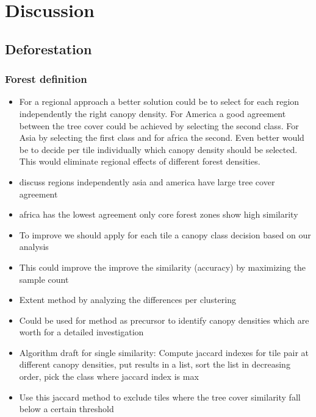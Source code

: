 \chapter{Discussion}
\label{ch:discussion}
	\section{Deforestation}
	\label{sec:discussion_deforestation}

		\subsection{Forest definition}
		\label{subsec:discussion_forest_definition}
			\begin{itemize}
				\item For a regional approach a better solution could be to select for each region independently the right canopy density. For America a good agreement between the tree cover could be achieved by selecting the second class. For Asia by selecting the first class and for africa the second. Even better would be to decide per tile individually which canopy density should be selected. This would eliminate regional effects of different forest densities.
				\item discuss regions independently asia and america have large tree cover agreement
				\item africa has the lowest agreement only core forest zones show high similarity
				\item To improve we should apply for each tile a canopy class decision based on our analysis
				\item This could improve the improve the similarity (accuracy) by maximizing the sample count
				\item Extent method by analyzing the differences per clustering
				\item Could be used for \citeauthor{Sannier2016} method as precursor to identify canopy densities which are worth for a detailed investigation
				\item Algorithm draft for single similarity: Compute jaccard indexes for tile pair at different canopy densities, put results in a list, sort the list in decreasing order, pick the class where jaccard index is max
				\item Use this jaccard method to exclude tiles where the tree cover similarity fall below a certain threshold
			\end{itemize}

